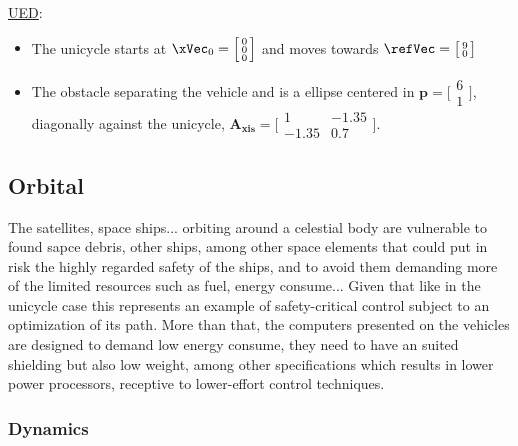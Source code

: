 \underline{UED}:
\label{ssssec:UED} %
\begin{itemize}
  \item The unicycle starts at \(\xVec_0 = \Bigl[\begin{smallmatrix} 0 \\ 0 \\ 0 \end{smallmatrix}\Bigr]\) and moves towards  \(\refVec = \bigl[\begin{smallmatrix} 9 \\ 0 \end{smallmatrix}\bigr]\)
  \item The obstacle separating the vehicle and \txtref is a ellipse centered in \(\mathbf{p} = \bigl[\begin{smallmatrix} 6 \\ 1 \end{smallmatrix}\bigr] \), diagonally against the unicycle, \(\mathbf{A_{xis}} = \bigl[\begin{smallmatrix} 1 & -1.35\\ -1.35 & 0.7\end{smallmatrix}\bigr]\).
\end{itemize}



\subsection{Orbital}
\label{subsec:orbital_simul_setup}

The satellites, space ships... orbiting around a celestial body are vulnerable to found sapce debris, other ships, among other space elements that could put in risk the highly regarded safety of the ships, and to avoid them demanding more of the limited resources such as fuel, energy consume... Given that like in the unicycle case this represents an example of safety-critical control subject to an optimization of its path.  More than that, the computers presented on the vehicles are designed to demand low energy consume, they need to have an suited shielding but also low weight, among other specifications which results in lower power processors, receptive to lower-effort control techniques.     

\subsubsection{Dynamics}
\label{subsubsec:orbital_dynamics}

